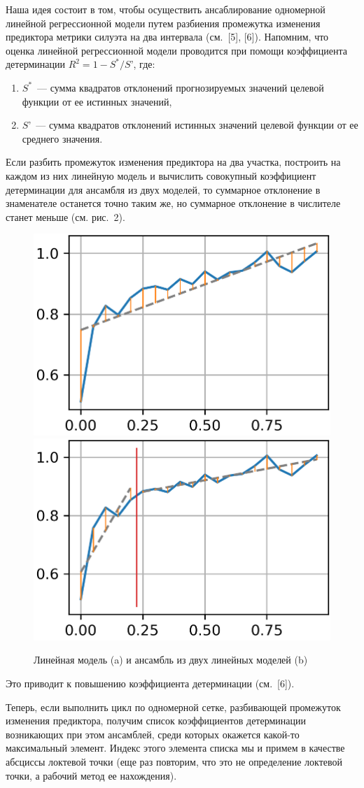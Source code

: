 \documentclass[a4paper,12pt]{article}
\begin{document}
Наша идея состоит в том, чтобы осуществить ансаблирование одномерной линейной регрессионной модели путем разбиения промежутка изменения предиктора метрики силуэта на два интервала (см. [5], [6]). Напомним, что оценка линейной регрессионной модели проводится при помощи коэффициента детерминации $R^2 = 1 - S^*/S’$, где:


\medskip\noindent
\begin{enumerate}
	\item $S^*$ — сумма квадратов отклонений прогнозируемых значений целевой функции от ее истинных значений,
	\item $S’$ — сумма квадратов отклонений истинных значений целевой функции от ее среднего значения.
\end{enumerate}

\medskip\noindent
Если разбить промежуток изменения предиктора на два участка, построить на каждом из них линейную модель и вычислить совокупный коэффициент детерминации для ансамбля из двух моделей, то суммарное отклонение в знаменателе останется точно таким же, но суммарное отклонение в числителе станет меньше (см. рис. 2).

\begin{figure}[!h]
	\centering
	\includegraphics[width=0.4\linewidth]{pictures/Без ансамбля}
	\hspace{0.05\linewidth}
	\includegraphics[width=0.4\linewidth]{pictures/С ансамблем}\\
	\caption{Линейная модель (a) и ансамбль из двух линейных моделей (b)}
\end{figure}

Это приводит к повышению коэффициента детерминации (см. [6]). 

Теперь, если выполнить цикл по одномерной сетке, разбивающей промежуток изменения предиктора, получим список коэффициентов детерминации возникающих при этом ансамблей, среди которых окажется какой-то максимальный элемент. Индекс этого элемента списка мы и примем в качестве абсциссы локтевой точки (еще раз повторим, что это не определение локтевой точки, а рабочий метод ее нахождения).
\end{document}
